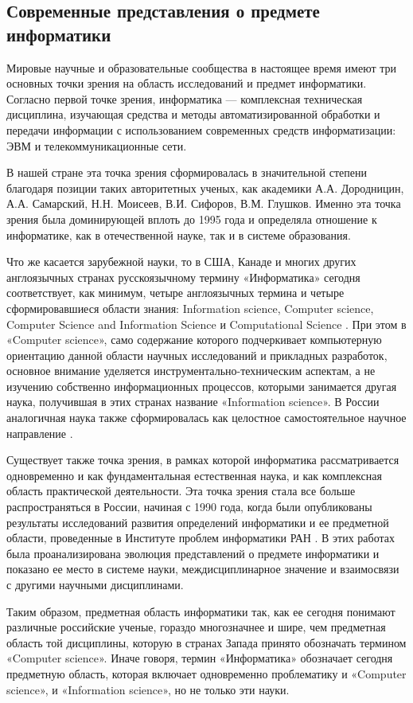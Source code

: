 \subsection{Современные представления о предмете информатики} \label{subsect1_2_3}

Мировые научные и образовательные  сообщества в настоящее время имеют три основных точки зрения на область исследований и предмет информатики. Согласно первой точке зрения, информатика --- комплексная техническая дисциплина, изучающая средства и методы автоматизированной обработки и передачи информации с использованием современных средств информатизации: ЭВМ и телекоммуникационные сети.

В нашей стране эта точка зрения сформировалась в значительной степени благодаря позиции таких авторитетных ученых, как академики А.А. Дородницин, А.А. Самарский, Н.Н. Моисеев, В.И. Сифоров, В.М. Глушков. Именно эта точка зрения была доминирующей вплоть до 1995 года и определяла отношение к информатике, как в отечественной науке, так и в системе образования.

Что же касается зарубежной науки, то в США, Канаде и многих других англоязычных странах русскоязычному термину «Информатика» сегодня соответствует, как минимум, четыре англоязычных термина и четыре сформировавшиеся области знания: Information science, Computer science, Computer Science and Information Science и Computational Science \cite{bib301}. При этом в «Computer science», само содержание которого подчеркивает компьютерную ориентацию данной области научных исследований и прикладных разработок, основное внимание уделяется инструментально-техническим аспектам, а не  изучению собственно информационных процессов, которыми занимается другая наука, получившая в этих странах название «Information science». В России аналогичная наука также сформировалась как целостное самостоятельное научное направление \cite{bib204,bib205,bib206}. 

Существует также точка зрения, в рамках которой информатика рассматривается одновременно и как фундаментальная естественная наука, и как комплексная область практической деятельности. Эта точка зрения стала все больше распространяться в России, начиная с 1990 года, когда были опубликованы  результаты исследований развития определений информатики  и ее предметной области, проведенные в Институте проблем информатики РАН \cite{bib208,bib209}. В этих работах была проанализирована  эволюция представлений о предмете информатики и показано ее место в системе науки,   междисциплинарное значение и взаимосвязи с другими научными дисциплинами. 

Таким образом, предметная область информатики так, как ее сегодня понимают различные российские ученые, гораздо многозначнее и шире, чем предметная область той дисциплины, которую в странах Запада принято обозначать термином «Computer science». Иначе говоря, термин «Информатика» обозначает сегодня предметную область, которая включает одновременно проблематику и «Computer science», и «Information science», но не только эти науки.



\clearpage